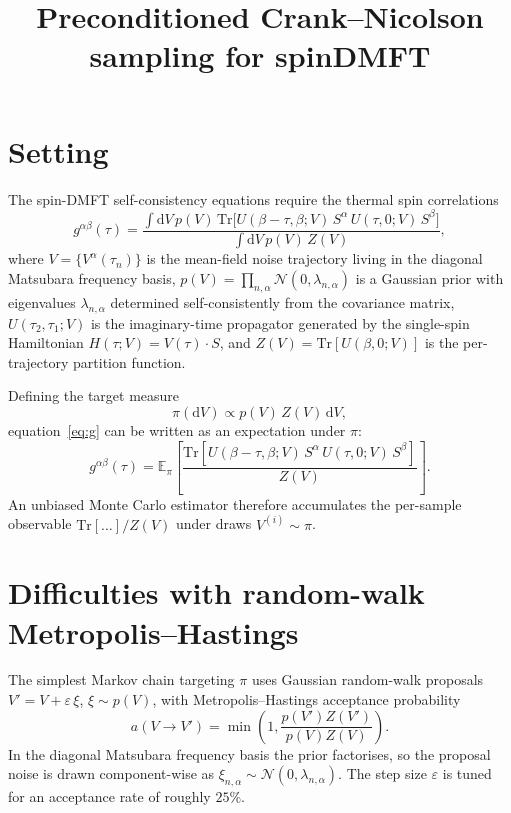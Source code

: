 \documentclass[11pt]{article}
\title{Preconditioned Crank--Nicolson sampling for spinDMFT}
\date{}
\newcommand{\dd}{\mathrm{d}}
\newcommand{\Tr}{\mathrm{Tr}}
\newcommand{\calN}{\mathcal{N}}
\begin{document}
\maketitle

\section{Setting}

The spin-DMF\!T self-consistency equations require the thermal spin correlations
\begin{equation}
    g^{\alpha\beta}(\tau)
    = \frac{\displaystyle\int \dd V\, p(V)\,
             \Tr\!\bigl[U(\beta{-}\tau,\beta;V)\,S^\alpha\,U(\tau,0;V)\,S^\beta\bigr]}
           {\displaystyle\int \dd V\, p(V)\, Z(V)},
    \label{eq:g}
\end{equation}
where $V = \{V^\alpha(\tau_n)\}$ is the mean-field noise trajectory living in the
diagonal Matsubara frequency basis,
$p(V) = \prod_{n,\alpha}\calN(0,\lambda_{n,\alpha})$ is a Gaussian prior with
eigenvalues $\lambda_{n,\alpha}$ determined self-consistently from the covariance
matrix, $U(\tau_2,\tau_1;V)$ is the imaginary-time propagator generated by the
single-spin Hamiltonian $H(\tau;V) = V(\tau)\cdot S$, and
$Z(V) = \Tr[U(\beta,0;V)]$ is the per-trajectory partition function.

Defining the target measure
\begin{equation}
    \pi(\dd V) \propto p(V)\,Z(V)\,\dd V,
    \label{eq:target}
\end{equation}
equation~\eqref{eq:g} can be written as an expectation under $\pi$:
\begin{equation}
    g^{\alpha\beta}(\tau)
    = \mathbb{E}_\pi\!\left[
        \frac{\Tr[U(\beta{-}\tau,\beta;V)\,S^\alpha\,U(\tau,0;V)\,S^\beta]}{Z(V)}
      \right].
\end{equation}
An unbiased Monte Carlo estimator therefore accumulates the per-sample observable
$\Tr[\ldots]/Z(V)$ under draws $V^{(i)}\sim\pi$.

\section{Difficulties with random-walk Metropolis--Hastings}

The simplest Markov chain targeting $\pi$ uses Gaussian random-walk proposals
$V' = V + \varepsilon\,\xi$, $\xi\sim p(V)$, with Metropolis--Hastings
acceptance probability
\begin{equation}
    a(V\to V')
    = \min\!\left(1,\frac{p(V')Z(V')}{p(V)Z(V)}\right).
\end{equation}
In the diagonal Matsubara frequency basis the prior factorises, so the proposal
noise is drawn component-wise as $\xi_{n,\alpha}\sim\calN(0,\lambda_{n,\alpha})$.
The step size $\varepsilon$ is tuned for an acceptance rate of roughly $25\%$.
\end{document}
